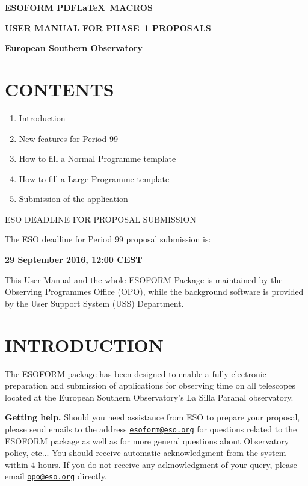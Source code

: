 \documentclass{article}
\begin{document}
\centerline{{\Large{\bf ESOFORM PDF\LaTeX\ MACROS}}}
\bigskip
\centerline{{\Large{\bf USER MANUAL FOR PHASE~1 PROPOSALS }}}
\bigskip
\centerline{{\bf European Southern Observatory }}
\vspace{3cm}

\def\period{99}

\section*{CONTENTS} 

\begin{enumerate}  
\item Introduction 
\item New features for Period 99
\item How to fill a Normal Programme template 
\item How to fill a Large  Programme template 
\item Submission of the application 
\end{enumerate} 

\vspace{3.0truecm}

\centerline{\large ESO DEADLINE FOR PROPOSAL SUBMISSION }
\medskip
\centerline{The ESO deadline for Period 99 proposal submission is:}
\medskip
\centerline{\huge \bf 29 September 2016, 12:00 CEST}

\vfill

\noindent This User Manual and the whole ESOFORM Package is
maintained by the Observing Programmes Office (OPO),
while the background software
is provided by the User Support System (USS) Department.

\break

\section{INTRODUCTION}

The ESOFORM package has been designed to enable a fully
electronic preparation and submission of applications for observing
time on all telescopes located at the European Southern Observatory's
La Silla Paranal observatory.

{\bf Getting help.} Should you need assistance from ESO to prepare
your proposal, please send emails to the address
\href{mailto:esoform@eso.org}{\tt esoform@eso.org} for questions
related to the ESOFORM package as well as for more general questions
about Observatory policy, etc...
You should receive automatic acknowledgment from the system within 
4 hours. If you do not receive any acknowledgment of your query, 
please email 
\href{mailto:opo@eso.org}{\tt opo@eso.org} directly.
\end{document}
